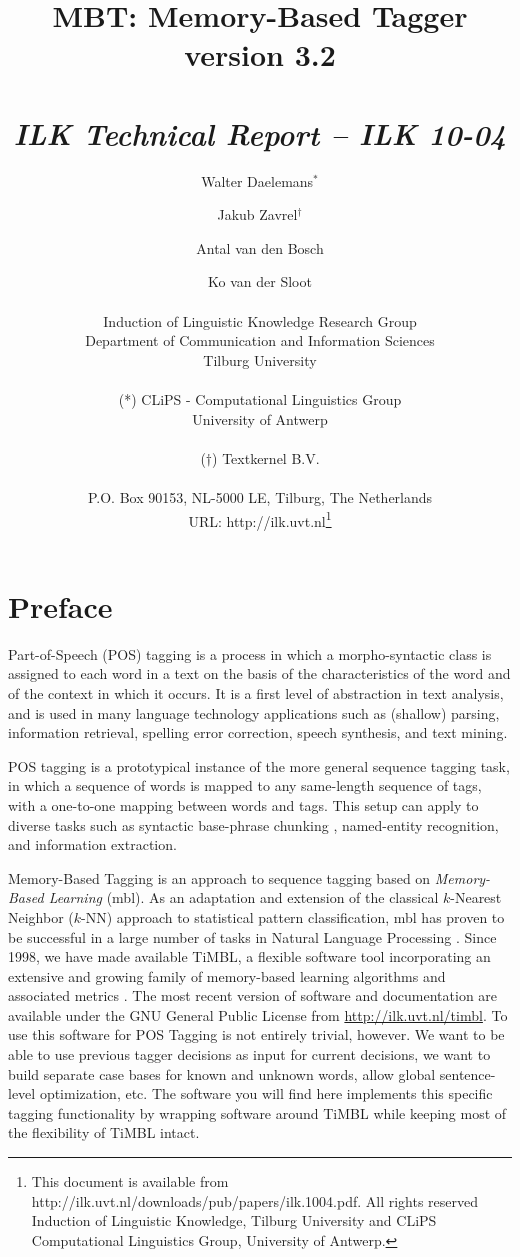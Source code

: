 \documentclass{report}
\author{Walter Daelemans$^*$ \and Jakub Zavrel$^\dagger$ \and
	Antal van den Bosch \and Ko van der Sloot\\ \ \\
	Induction of Linguistic Knowledge Research Group\\
	Department of Communication and Information Sciences\\ 
        Tilburg University \\ \\
	(*) CLiPS - Computational Linguistics Group\\
	University of Antwerp\\ \\
	($\dagger$) Textkernel B.V.\\ \\
        P.O. Box 90153, NL-5000 LE, Tilburg, The Netherlands \\ 
        URL: http://ilk.uvt.nl\thanks{This document is available from
	http://ilk.uvt.nl/downloads/pub/papers/ilk.1004.pdf. All rights reserved
	Induction of Linguistic Knowledge, Tilburg University and 
        CLiPS Computational Linguistics Group, University of Antwerp.}}
\title{{\huge MBT: Memory-Based Tagger} \\ \vspace*{0.5cm}
{\bf version 3.2} \\ \vspace*{0.5cm}{\huge Reference Guide}\\
\vspace*{1cm} {\it ILK Technical Report -- ILK 10-04}}
\begin{document}

\maketitle

\tableofcontents

\chapter*{Preface}

Part-of-Speech (POS) tagging is a process in which a morpho-syntactic
class is assigned to each word in a text on the basis of the
characteristics of the word and of the context in which it occurs. It
is a first level of abstraction in text analysis, and is used in many
language technology applications such as (shallow) parsing,
information retrieval, spelling error correction, speech synthesis, and
text mining.

POS tagging is a prototypical instance of the more general sequence
tagging task, in which a sequence of words is mapped to any
same-length sequence of tags, with a one-to-one mapping between words
and tags. This setup can apply to diverse tasks such as syntactic
base-phrase chunking \cite{Sang+00}, named-entity recognition, and
information extraction.

Memory-Based Tagging is an approach to sequence tagging based on {\em
  Memory-Based Learning} ({\sc mbl}).  As an adaptation and extension
of the classical $k$-Nearest Neighbor ($k$-NN) approach to statistical
pattern classification, {\sc mbl} has proven to be successful in a
large number of tasks in Natural Language Processing
\cite{Daelemans+05}. Since 1998, we have made available TiMBL, a
flexible software tool incorporating an extensive and growing family
of memory-based learning algorithms and associated metrics
\cite{Daelemans+07}. The most recent version of software and
documentation are available under the GNU General Public License from
\url{http://ilk.uvt.nl/timbl}.  To use this software for POS Tagging
is not entirely trivial, however. We want to be able to use previous
tagger decisions as input for current decisions, we want to build
separate case bases for known and unknown words, allow global
sentence-level optimization, etc.  The software you will find here
implements this specific tagging functionality by wrapping software
around TiMBL while keeping most of the flexibility of TiMBL intact.
\end{document}
